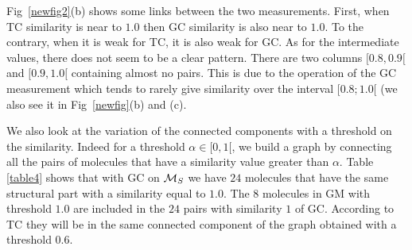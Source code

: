 \documentclass[10pt,letterpaper]{article}
\begin{document}
 Fig~\ref{newfig2}(b) shows some links between the two measurements. First, when TC similarity is near to $1.0$ then GC similarity is also near to $1.0$. To the contrary, when it is weak for TC, it is also weak for GC. As for the intermediate values, there does not seem to be a clear pattern. There are two columns $[0.8, 0.9[$ and $[0.9, 1.0[$ containing almost no pairs. This is due to the operation of the GC measurement which tends to rarely give similarity over the interval $[0.8; 1.0 [$ (we also see it in Fig~\ref{newfig}(b) and (c).
 
 
We also look at the variation of the connected components with a threshold on the similarity. Indeed for a threshold $\alpha \in [0,1[$, we build a graph by connecting all the pairs of molecules that have a similarity value greater than $\alpha$. Table \ref{table4} shows that with GC on ${\cal M}_S$ we have $24$ molecules that have the same structural part with a similarity equal to $1.0$. The $8$ molecules in GM with threshold $1.0$ are included in the $24$ pairs with similarity $1$ of GC. According to TC they will be in the same connected component of the graph obtained with a threshold $0.6$.
\end{document}
